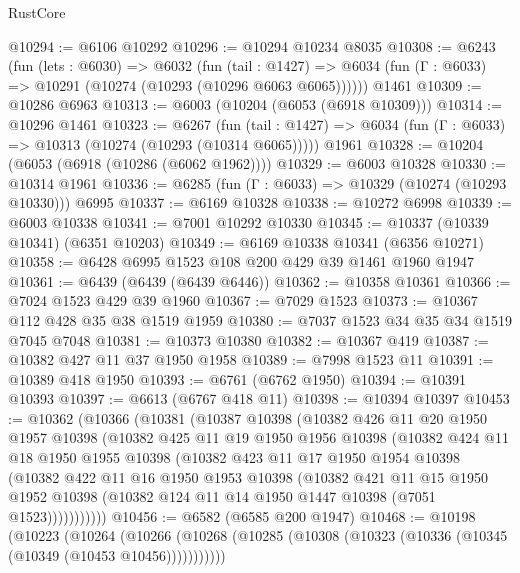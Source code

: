 \begin{lexlean}{RustCore}
\begin{coremodule}
@10294 := @6106 @10292
@10296 := @10294 @10234 @8035
@10308 := @6243
    (fun (lets : @6030) =>
    @6032
      (fun (tail : @1427) =>
      @6034 (fun (Γ : @6033) => @10291 (@10274 (@10293 (@10296 @6063 @6065))))))
    @1461
@10309 := @10286 @6963
@10313 := @6003 (@10204 (@6053 (@6918 @10309)))
@10314 := @10296 @1461
@10323 := @6267
    (fun (tail : @1427) => @6034 (fun (Γ : @6033) => @10313 (@10274 (@10293 (@10314 @6065)))))
    @1961
@10328 := @10204 (@6053 (@6918 (@10286 (@6062 @1962))))
@10329 := @6003 @10328
@10330 := @10314 @1961
@10336 := @6285 (fun (Γ : @6033) => @10329 (@10274 (@10293 @10330))) @6995
@10337 := @6169 @10328
@10338 := @10272 @6998
@10339 := @6003 @10338
@10341 := @7001 @10292 @10330
@10345 := @10337 (@10339 @10341) (@6351 @10203)
@10349 := @6169 @10338 @10341 (@6356 @10271)
@10358 := @6428 @6995 @1523 @108 @200 @429 @39 @1461 @1960 @1947
@10361 := @6439 (@6439 (@6439 @6446))
@10362 := @10358 @10361
@10366 := @7024 @1523 @429 @39 @1960
@10367 := @7029 @1523
@10373 := @10367 @112 @428 @35 @38 @1519 @1959
@10380 := @7037 @1523 @34 @35 @34 @1519 @7045 @7048
@10381 := @10373 @10380
@10382 := @10367 @419
@10387 := @10382 @427 @11 @37 @1950 @1958
@10389 := @7998 @1523 @11
@10391 := @10389 @418 @1950
@10393 := @6761 (@6762 @1950)
@10394 := @10391 @10393
@10397 := @6613 (@6767 @418 @11)
@10398 := @10394 @10397
@10453 := @10362
    (@10366
      (@10381
        (@10387
          @10398
          (@10382
            @426
            @11
            @20
            @1950
            @1957
            @10398
            (@10382
              @425
              @11
              @19
              @1950
              @1956
              @10398
              (@10382
                @424
                @11
                @18
                @1950
                @1955
                @10398
                (@10382
                  @423
                  @11
                  @17
                  @1950
                  @1954
                  @10398
                  (@10382
                    @422
                    @11
                    @16
                    @1950
                    @1953
                    @10398
                    (@10382
                      @421
                      @11
                      @15
                      @1950
                      @1952
                      @10398
                      (@10382 @124 @11 @14 @1950 @1447 @10398 (@7051 @1523)))))))))))
@10456 := @6582 (@6585 @200 @1947)
@10468 := @10198
    (@10223
      (@10264
        (@10266 (@10268 (@10285 (@10308 (@10323 (@10336 (@10345 (@10349 (@10453 @10456)))))))))))

\end{coremodule}
\end{lexlean}
